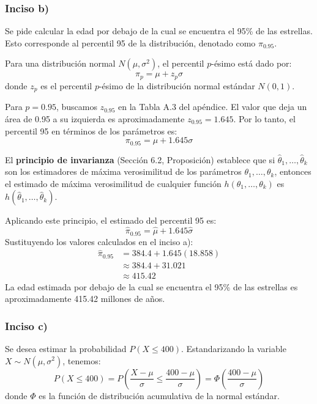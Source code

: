 \documentclass[12pt]{article}
\begin{document}
\subsubsection*{Inciso b)}
Se pide calcular la edad por debajo de la cual se encuentra el 95\% de las estrellas. Esto corresponde al percentil 95 de la distribución, denotado como $\pi_{0.95}$.

Para una distribución normal $N(\mu, \sigma^2)$, el percentil $p$-ésimo está dado por:
\[ \pi_p = \mu + z_p \sigma \]
donde $z_p$ es el percentil $p$-ésimo de la distribución normal estándar $N(0,1)$.

Para $p = 0.95$, buscamos $z_{0.95}$ en la Tabla A.3 del apéndice. El valor que deja un área de 0.95 a su izquierda es aproximadamente $z_{0.95} = 1.645$.
Por lo tanto, el percentil 95 en términos de los parámetros es:
\[ \pi_{0.95} = \mu + 1.645\sigma \]

El \textbf{principio de invarianza} (Sección 6.2, Proposición) establece que si $\hat{\theta}_1, \dots, \hat{\theta}_k$ son los estimadores de máxima verosimilitud de los parámetros $\theta_1, \dots, \theta_k$, entonces el estimado de máxima verosimilitud de cualquier función $h(\theta_1, \dots, \theta_k)$ es $h(\hat{\theta}_1, \dots, \hat{\theta}_k)$.

Aplicando este principio, el estimado del percentil 95 es:
\[ \hat{\pi}_{0.95} = \hat{\mu} + 1.645\hat{\sigma} \]
Sustituyendo los valores calculados en el inciso a):
\begin{align*}
    \hat{\pi}_{0.95} &= 384.4 + 1.645(18.858) \\
    &\approx 384.4 + 31.021 \\
    &\approx 415.42
\end{align*}
La edad estimada por debajo de la cual se encuentra el 95\% de las estrellas es aproximadamente 415.42 millones de años.

\subsubsection*{Inciso c)}
Se desea estimar la probabilidad $P(X \le 400)$.
Estandarizando la variable $X \sim N(\mu, \sigma^2)$, tenemos:
\[ P(X \le 400) = P\left(\frac{X - \mu}{\sigma} \le \frac{400 - \mu}{\sigma}\right) = \Phi\left(\frac{400 - \mu}{\sigma}\right) \]
donde $\Phi$ es la función de distribución acumulativa de la normal estándar.
\end{document}
